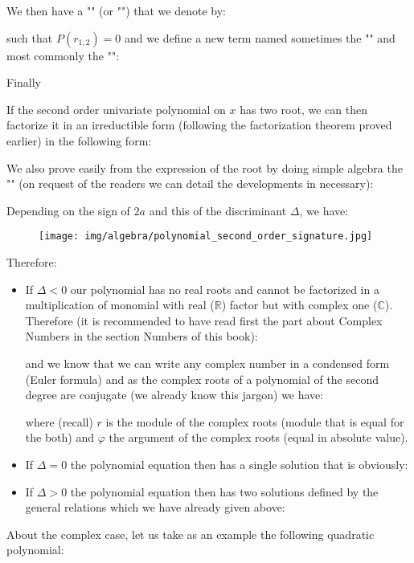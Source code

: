	We then have a "\label{double root}" (or "") that we denote by:
	
	such that $P(r_{1,2})=0$ and we define a new term named sometimes the "" and most commonly the "\label{discriminant}":
		
	Finally\label{second order polynomial roots}
	
	If the second order univariate polynomial on $x$ has two root, we can then factorize it in an irreductible form (following the factorization theorem proved earlier) in the following form:
	
	We also prove easily from the expression of the root by doing simple algebra the "\label{vieta relations}" (on request of the readers we can detail the developments in necessary):
	
	
	Depending on the sign of $2a$ and this of the discriminant $\Delta$, we have:
	\begin{figure}[H]
		\centering
		\texttt{[image: img/algebra/polynomial\_second\_order\_signature.jpg]}
	\end{figure}
	Therefore:
	\begin{itemize}
		\item If $\Delta<0$ our polynomial has no real roots and cannot be factorized in a multiplication of monomial with real ($
\mathbb{R}$) factor but with complex one ($\mathbb{C}$). Therefore (it is recommended to have read first the part about Complex Numbers in the section Numbers of this book):
		
		and we know that we can write any complex number in a condensed form (Euler formula) and as the complex roots of a polynomial of the second degree are conjugate (we already know this jargon) we have:
		
		where (recall) $r$ is the module of the complex roots (module that is equal for the both) and $\varphi$ the argument of the complex roots (equal in absolute value).
		
		\item If $\Delta=0$ the polynomial equation then has a single solution that is obviously:
		
		
		\item If $\Delta>0$ the polynomial equation then has two solutions defined by the general relations which we have already given above:
		
	\end{itemize}
	About the complex case, let us take as an example the following quadratic polynomial:
	
